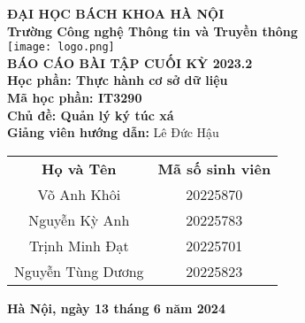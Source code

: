 \documentclass[a4paper,12pt]{article}
\begin{document}
\begin{titlepage}
    \begin{center}
        \textbf{\large ĐẠI HỌC BÁCH KHOA HÀ NỘI}\\
        \textbf{\large Trường Công nghệ Thông tin và Truyền thông}\\[1cm]
        \texttt{[image: logo.png]} \\[1cm] %
       
        
        \textbf{\Huge BÁO CÁO BÀI TẬP CUỐI KỲ 2023.2}\\[0.5cm]
        \textbf{\Huge Học phần: Thực hành cơ sở dữ liệu}\\[0.5cm]
        \textbf{\Huge Mã học phần: IT3290}\\[0.5cm]
        \textbf{\Huge Chủ đề: Quản lý ký túc xá}\\[0.5cm]
        \textbf{Giảng viên hướng dẫn:} Lê Đức Hậu\\
            \begin{tabular}{cc}
  
    \textbf{Họ và Tên} & \textbf{Mã số sinh viên}  \\

    Võ Anh Khôi & 20225870  \\

    Nguyễn Kỳ Anh & 20225783  \\
 
    Trịnh Minh Đạt & 20225701  \\

    Nguyễn Tùng Dương & 20225823

\end{tabular}
        
        \vfill
        
        \textbf{\large Hà Nội, ngày 13 tháng 6 năm 2024}
        
    \end{center}
\end{titlepage}
\end{document}
